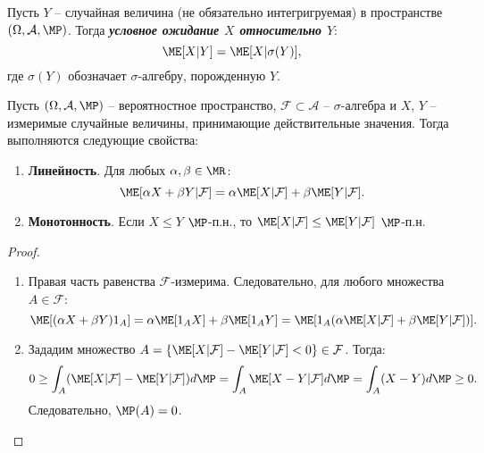 \begin{defn}
	Пусть $Y$ -- случайная величина (не обязательно интегригруемая) в пространстве $(\Omega, \mathcal{A}, \MP)$. Тогда \textbf{\textit{условное ожидание $X$ относительно $Y$}}:
	\[ \ME[X|Y]=\ME[X|\sigma(Y)], \]
	где $\sigma(Y)$ обозначает $\sigma$-алгебру, порожденную $Y$.
\end{defn}

\begin{lmm} \label{Properties of conditional expectation}
	Пусть $(\Omega, \mathcal{A}, \MP)$ -- вероятностное пространство, $\mathcal{F} \subset \mathcal{A}$ -- $\sigma$-алгебра и $X$, $Y$ -- измеримые случайные величины, принимающие действительные значения. Тогда выполняются следующие свойства:
	\begin{enumerate}
		\item \textbf{Линейность}. Для любых $\alpha, \beta \in \MR$:
		\[ \ME[\alpha X + \beta Y | \mathcal{F}]=\alpha \ME[X|\mathcal{F}]+\beta \ME[Y|\mathcal{F}]. \]
		\item \textbf{Монотонность}. Если $X \leq Y$ $\MP$-п.н., то $\ME[X|\mathcal{F}] \leq \ME[Y|\mathcal{F}]$ $\MP$-п.н.
	\end{enumerate}
\end{lmm}
\begin{proof}
		\begin{enumerate}
		\item Правая часть равенства $\mathcal{F}$-измерима. Следовательно, для любого множества $A \in \mathcal{F}$:
		\[ \ME[(\alpha X + \beta Y)1_A]=\alpha \ME[1_A X]+\beta \ME[1_A Y]=\ME[1_A(\alpha \ME[X|\mathcal{F}] + \beta \ME[Y|\mathcal{F}])]. \]
		\item Зададим множество $ A= \{ \ME[X|\mathcal{F}] - \ME[Y|\mathcal{F}] <0 \} \in \mathcal{F}$. Тогда:
		\[ 0 \geq \int_A (\ME[X|\mathcal{F}] - \ME[Y|\mathcal{F}]) d\MP = \int_A \ME[X-Y|\mathcal{F}]d\MP = \int_A (X-Y) d\MP \geq 0. \]
		Следовательно, $\MP(A)=0$.
	\end{enumerate}
\end{proof}

